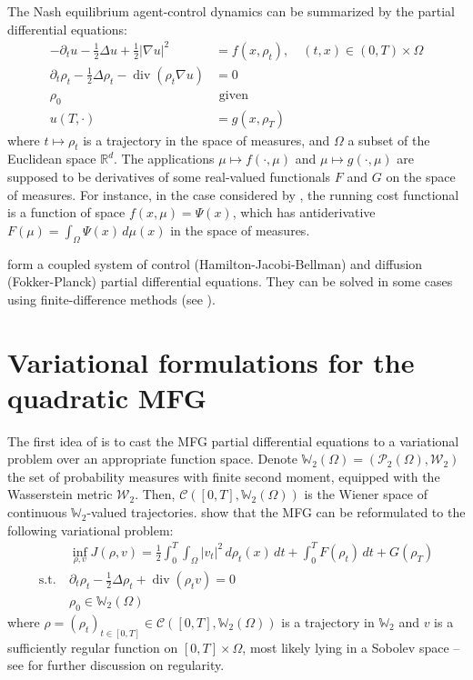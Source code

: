 \documentclass[11pt]{article}
\newcommand{\RR}{\mathbb{R}}
\newcommand{\WW}{\mathbb{W}}
\newcommand{\calC}{\mathcal{C}}
\newcommand{\calP}{\mathcal{P}}
\newcommand{\calW}{\mathcal{W}}
\newcommand{\suchthat}{\mathrm{s.t.}}
\DeclareMathOperator{\divg}{div}
\numberwithin{equation}{section}
\theoremstyle{definition}
\begin{document}
The Nash equilibrium agent-control dynamics can be summarized by the partial differential equations:
\begin{subequations}\label{eq:VariationalQuadraticMFG}
\begin{align}\label{eq:VarQuadMFGHJB}
	-\partial_t u - \frac{1}{2}\Delta u + \frac12|\nabla u|^2 &= f(x, \rho_t), \quad (t,x) \in  (0, T) \times \Omega \\\label{eq:VarQuadMFGKolmo}
	\partial_t \rho_t - \frac{1}{2}\Delta\rho_t - \divg(\rho_t \nabla u) &= 0 \\
	\rho_0 &\text{ given} \\
	u(T, \cdot) &= g(x, \rho_T)
\end{align}
\end{subequations}
where $t\mapsto \rho_t$ is a trajectory in the space of measures, and $\Omega$ a subset of the Euclidean space $\RR^d$. The applications $\mu\mapsto f(\cdot, \mu)$ and $\mu\mapsto g(\cdot, \mu)$ are supposed to be derivatives of some real-valued functionals $F$ and $G$ on the space of measures. For instance, in the case considered by \textcite{benamou:hal-01295299}, the running cost functional is a function of space $f(x, \mu) = \Psi(x)$, which has antiderivative $F(\mu) = \int_\Omega \Psi(x) \,d\mu(x)$ in the space of measures.

 form a coupled system of control (Hamilton-Jacobi-Bellman) and diffusion (Fokker-Planck) partial differential equations. They can be solved in some cases using finite-difference methods (see \textcite{achdou:hal-01456506}).

\section{Variational formulations for the quadratic MFG}

The first idea of \cite{benamou:hal-01295299} is to cast the MFG partial differential equations to a variational problem over an appropriate function space. Denote $\WW_2(\Omega) = (\calP_2(\Omega), \calW_2)$ the set of probability measures with finite second moment, equipped with the Wasserstein metric $\calW_2$. Then, $\mathcal{C}([0, T], \WW_2(\Omega))$ is the Wiener space of continuous $\WW_2$-valued trajectories.
\textcite{benamou:hal-01295299} show that the MFG can be reformulated to the following variational problem:
\begin{equation}\label{eq:EulerianProblem}
\begin{aligned}
   	&\inf_{\rho,v} J(\rho, v) =
   	\frac{1}{2}\int_0^T\int_\Omega |v_t|^2 \,d\rho_t(x)\,dt + \int_0^T F(\rho_t)\,dt + G(\rho_T)
   	\\
   	\suchthat\ &\partial_t \rho_t - \frac12\Delta \rho_t + \divg(\rho_t v) = 0 \\
   	&\rho_0 \in \WW_2(\Omega)	
\end{aligned}
\end{equation}
where $\rho = (\rho_t)_{t\in[0,T]}\in \calC([0,T], \WW_2(\Omega))$ is a trajectory in $\WW_2$ and $v$ is a sufficiently regular function on $[0,T] \times \Omega$, most likely lying in a Sobolev space -- see \cite{benamou:hal-01295299} for further discussion on regularity.
\end{document}
